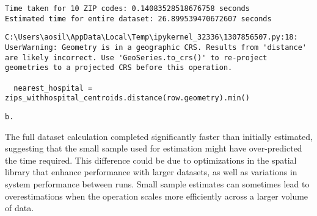 \documentclass[
  letterpaper,
  DIV=11,
  numbers=noendperiod]{scrartcl}
\begin{document}
\begin{verbatim}
Time taken for 10 ZIP codes: 0.14083528518676758 seconds
Estimated time for entire dataset: 26.899539470672607 seconds
\end{verbatim}

\begin{verbatim}
C:\Users\aosil\AppData\Local\Temp\ipykernel_32336\1307856507.py:18: UserWarning: Geometry is in a geographic CRS. Results from 'distance' are likely incorrect. Use 'GeoSeries.to_crs()' to re-project geometries to a projected CRS before this operation.

  nearest_hospital = zips_withhospital_centroids.distance(row.geometry).min()
\end{verbatim}

\begin{verbatim}
b.
\end{verbatim}

The full dataset calculation completed significantly faster than
initially estimated, suggesting that the small sample used for
estimation might have over-predicted the time required. This difference
could be due to optimizations in the spatial library that enhance
performance with larger datasets, as well as variations in system
performance between runs. Small sample estimates can sometimes lead to
overestimations when the operation scales more efficiently across a
larger volume of data.
\end{document}
